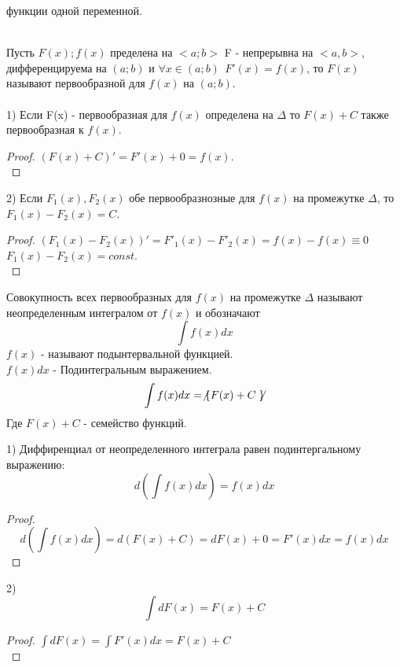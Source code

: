 \begin{title}
  функции одной переменной.
\end{title}

\\
Пусть $F(x); f(x)$ пределена на $<a;b>$ F - непрерывна на $<a,b>$,
дифференцируема на $(a;b)$ и $\forall x \in (a; b) ~~ F'(x) = f(x)$, то $F(x)$
называют первообразной для $f(x)$ на $(a;b)$.\\

\\
1) Если F(x) - первообразная для $f(x)$ определена на $\Delta$ то $F(x) + C$
также первообразная к $f(x)$.\\
\begin{proof}
  $(F(x) + C)' = F'(x) + 0 = f(x)$.\\
\end{proof}

2) Если $F_{1}(x), F_{2}(x)$ обе первообразнозные для $f(x)$ на промежутке
$\Delta$, то $F_{1}(x) - F_{2}(x) = C$.\\
\begin{proof}
  $(F_{1}(x) - F_{2}(x))' = F'_{1}(x) - F'_{2}(x) = f(x) - f(x) \equiv 0$\\
  $F_{1}(x) - F_{2}(x) = const$.\\
\end{proof}

\begin{defin}
  Совокупность всех первообразных для $f(x)$ на промежутке $\Delta$ называют
  неопределенным интегралом от $f(x)$ и обозначают
  \[\int f(x)dx\]
  $f(x)$ - называют подынтервальной функцией.\\
  $f(x)dx$ - Подинтегральным выражением.
  \[\int f(x)dx = \not\{ F(x) + C \not\} \]
  Где $F(x) + C$ - семейство функций.\\
\end{defin}

1) Диффиренциал от неопределенного интеграла равен подинтергальному выражению:
\[d \left ( \int f(x)dx \right ) = f(x)dx \]
\begin{proof}
  \[d \left ( \int f(x)dx \right ) = d(F(x) + C) = dF(x) + 0 = F'(x)dx
  = f(x)dx\]
\end{proof}

2)\[\int dF(x) = F(x) + C\]
\begin{proof}
  $\int dF(x) = \int F'(x)dx = F(x) + C$ \\
\end{proof}

